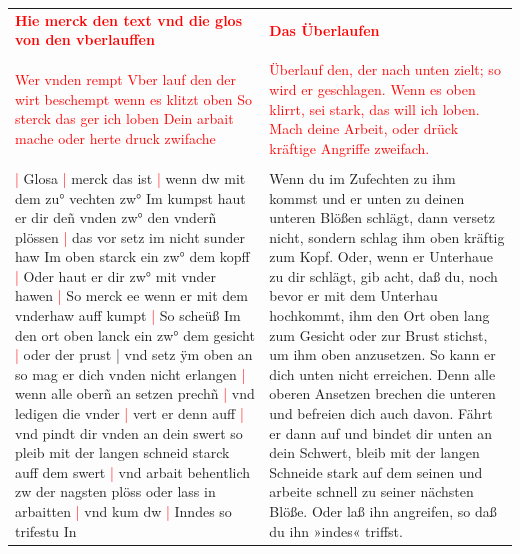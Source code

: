 \begin{longtable}{p{6.25cm}p{6.25cm}}
    \textbf{\textcolor{red}{
        Hie merck den text vnd die glos von den vberlauffen}}
    &
    \textbf{\textcolor{red}{
        Das Überlaufen}}
    \\
    \\
    \textcolor{red}{
        Wer vnden rempt Vber lauf den der wirt beschempt
        wenn es klitzt oben So sterck das ger ich loben
        Dein arbait mache oder herte druck zwifache}
    &
    \textcolor{red}{
        Überlauf den, der nach unten zielt; so wird er geschlagen.
        Wenn es oben klirrt, sei stark, das will ich loben.
        Mach deine Arbeit, oder drück kräftige Angriffe zweifach.}
    \\
    \\
    \textcolor{red}{|} Glosa
    \textcolor{red}{|} merck das ist
    \textcolor{red}{|} wenn dw mit dem zu° vechten zw° Im kumpst haut er dir deñ vnden zw° den vnderñ plössen
    \textcolor{red}{|} das vor setz im nicht sunder haw Im oben starck ein zw° dem kopff
    \textcolor{red}{|} Oder haut er dir zw° mit vnder hawen
    \textcolor{red}{|} So merck ee wenn er mit dem vnderhaw auff kumpt
    \textcolor{red}{|} So scheüß Im den ort oben lanck ein zw° dem gesicht
    \textcolor{red}{|} oder der prust | vnd setz ÿm oben an so mag er dich vnden nicht erlangen
    \textcolor{red}{|} wenn alle oberñ an setzen prechñ
    \textcolor{red}{|} vnd ledigen die vnder
    \textcolor{red}{|} vert er denn auff
    \textcolor{red}{|} vnd pindt dir vnden an dein swert so pleib mit der langen schneid starck auff dem swert
    \textcolor{red}{|} vnd arbait behentlich zw der nagsten plöss oder lass in arbaitten
    \textcolor{red}{|} vnd kum dw
    \textcolor{red}{|} Inndes so trifestu In
    &
    Wenn du im Zufechten zu ihm kommst und er unten zu deinen unteren Blößen schlägt, dann versetz nicht, sondern schlag ihm oben kräftig zum Kopf.
    Oder, wenn er Unterhaue zu dir schlägt, gib acht, daß du, noch bevor er mit dem Unterhau hochkommt, ihm den Ort oben lang zum Gesicht oder zur Brust stichst, um ihm oben anzusetzen.
    So kann er dich unten nicht erreichen.
    Denn alle oberen Ansetzen brechen die unteren und befreien dich auch davon.
    Fährt er dann auf und bindet dir unten an dein Schwert, bleib mit der langen Schneide stark auf dem seinen und arbeite schnell zu seiner nächsten Blöße.
    Oder laß ihn angreifen, so daß du ihn »indes« triffst.
\end{longtable}

\newpage


